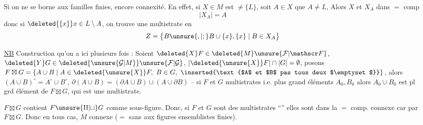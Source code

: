Si on ne se borne aux familles finies,  encore connexité. En effet, si $X\in M$ est $\ne\{L\}$, soit $A\in X$  que $A\ne L$, Alors $X$ et $X_A$ dans $=$ comp 
\[
\lvert X_A\rvert=A
\]
donc si $\deleted{\{x\}}x\in L\setminus A$, on trouve une multistrate en 
\[
Z=\bigl\{B\unsure{,|;}B\cup\{x\},\{x\}\mid B\in X_A\bigr\}
\]
\margin{\unsure{,}}

\uline{NB} Construction qu'on a  ici plusieurs fois : Soient $\deleted{X}F\in\deleted{M}\unsure{\mathcal F|\mathscr F}$, $\deleted{Y}G\in\deleted{\unsure{\mathcal G|M}}\unsure{\mathcal F|\mathcal G}$, $\lvert\deleted{\unsure{X}}F\rvert\cap\lvert G\rvert=\emptyset$, posons $F\boxtimes G=\{A\cup B\mid A\in\deleted{\unsure{X}}F,\ B\in G,\ \inserted{\text{$A$ et $B$ pas tous deux $\emptyset$}}\}$, alors $(A\cup B)^{\circ}=A^{\circ}\cup B^{\circ}$, $\partial(A\cup B)=(\partial A\cup B)\cup(A\cup\partial B)$ -- si $F$ et $G$   multistrates i.e.   plus grand éléments  $A_0,B_0$ alors $A_0\cup B_0$ est pl grd élément de $F\boxtimes G$, qui est une multistrate.

 $F\boxtimes G$ contient $F\unsure{\amalg|\sqcup}G$ comme sous-figure. Donc, si $F$ et $G$ sont des multistrates ``'' elles sont dans la $=$ comp. connexe car  par $F\boxtimes G$. Donc en tous cas, \margin{\unsure{,|)}} $M$ connexe ($=$ sans   aux  figures ensemblistes finies).
